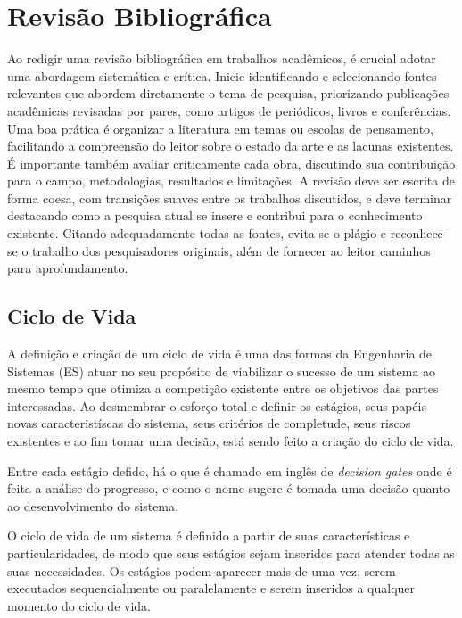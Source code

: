
\chapter{Revisão Bibliográfica}\label{chap:revisao}

	Ao redigir uma revisão bibliográfica em trabalhos acadêmicos, é crucial adotar uma abordagem sistemática e crítica. Inicie identificando e selecionando fontes 
	relevantes que abordem diretamente o tema de pesquisa, priorizando publicações acadêmicas revisadas por pares, como artigos de periódicos, livros e conferências. 
	Uma boa prática é organizar a literatura em temas ou escolas de pensamento, facilitando a compreensão do leitor sobre o estado da arte e as lacunas existentes. 
	É importante também avaliar criticamente cada obra, discutindo sua contribuição para o campo, metodologias, resultados e limitações. A revisão deve ser escrita 
	de forma coesa, com transições suaves entre os trabalhos discutidos, e deve terminar destacando como a pesquisa atual se insere e contribui para o conhecimento 
	existente. Citando adequadamente todas as fontes, evita-se o plágio e reconhece-se o trabalho dos pesquisadores originais, além de fornecer ao leitor caminhos 
	para aprofundamento.

\section{Ciclo de Vida}

	A definição e criação de um ciclo de vida é uma das formas da Engenharia de Sistemas (ES) atuar no seu propósito de viabilizar o sucesso de um sistema ao
	mesmo tempo que otimiza a competição existente entre os objetivos das partes interessadas. Ao desmembrar o esforço total e definir os estágios, seus papéis novas
	caracteristíscas do sistema, seus critérios de completude, seus riscos existentes e ao fim tomar uma decisão, está sendo feito a criação do ciclo de vida.

	Entre cada estágio defido, há o que é chamado em inglês de \textit{decision gates} onde é feita a análise do progresso, e como o nome sugere é tomada uma decisão
	quanto ao desenvolvimento do sistema.

	O ciclo de vida de um sistema é definido a partir de suas características e particularidades, de modo que seus estágios sejam inseridos para atender todas as suas
	necessidades. Os estágios podem aparecer mais de uma vez, serem executados sequencialmente ou paralelamente e serem inseridos a qualquer momento do ciclo de vida.

